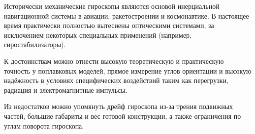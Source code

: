 Исторически механические гироскопы являются основой инерциальной навигационной системы в авиации, ракетостроении и космонавтике. В настоящее время практически полностью вытеснены оптическими системами, за исключением некоторых специальных применений (например, гиростабилизаторы).

К достоинствам можно отнести высокую теоретическую и практическую точность у поплавковых моделей, прямое измерение углов ориентации и высокую надёжность в условиях специфических воздействий таким как перегрузки, радиация и электромагнитные импульсы.

Из недостатков можно упомянуть дрейф гироскопа из-за трения подвижных частей, большие габариты и вес готовой конструкции, а также ограничения по углам поворота гироскопа.

